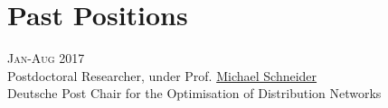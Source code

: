 \section*{Past Positions}

\begin{paracol}{2}
  \textsc{Jan-Aug 2017}
\switchcolumn
  \\
  Postdoctoral Researcher, under Prof. \href{http://www.dpor.rwth-aachen.de/}{Michael Schneider}\\
  Deutsche Post Chair for the Optimisation of Distribution Networks
\end{paracol}